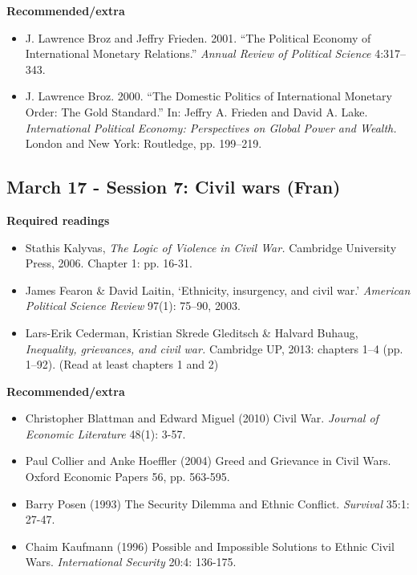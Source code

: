 \documentclass[12pt, a4paper]{article}
\begin{document}
\noindent \textbf{Recommended/extra}

\begin{itemize}
\item J. Lawrence Broz and Jeffry Frieden. 2001. ``The Political Economy of International Monetary Relations.'' \emph{Annual Review of Political Science} 4:317--343.
\item J. Lawrence Broz. 2000. ``The Domestic Politics of International Monetary Order: The Gold Standard.'' In: Jeffry A. Frieden and David A. Lake. \emph{International Political Economy: Perspectives on Global Power and Wealth.} London and New York: Routledge, pp. 199--219.
\end{itemize}

\subsection*{March 17 - Session 7: Civil wars (Fran)}

\noindent \textbf{Required readings}

\begin{itemize}
  \item Stathis Kalyvas, \textit{The Logic of Violence in Civil War.} Cambridge University Press, 2006. Chapter 1: pp. 16-31.
  \item James Fearon \& David Laitin, `Ethnicity, insurgency, and civil war.' \textit{American Political Science Review} 97(1): 75--90, 2003.
  \item Lars-Erik Cederman, Kristian Skrede Gleditsch \& Halvard Buhaug, \textit{Inequality, grievances, and civil war.} Cambridge UP, 2013: chapters 1--4 (pp. 1--92). (Read at least chapters 1 and 2)
\end{itemize}

\noindent \textbf{Recommended/extra}

\begin{itemize}
  \item Christopher Blattman and Edward Miguel (2010) Civil War. \textit{Journal of Economic Literature} 48(1): 3-57.
  \item Paul Collier and Anke Hoeffler (2004) Greed and Grievance in Civil Wars. Oxford Economic Papers 56, pp. 563-595.
  \item Barry Posen (1993) The Security Dilemma and Ethnic Conflict. \textit{Survival} 35:1: 27-47.
  \item Chaim Kaufmann (1996) Possible and Impossible Solutions to Ethnic Civil Wars. \textit{International Security} 20:4: 136-175.
\end{itemize}
\end{document}
